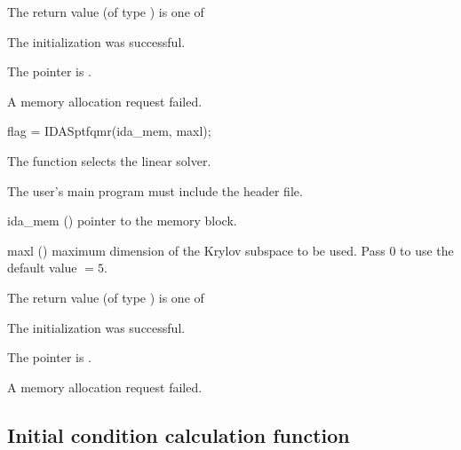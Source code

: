 {
  The return value  (of type ) is one of
  \begin{args}
  \item[\Id{IDASPILS\_SUCCESS}] 
    The {\idaspbcg} initialization was successful.
  \item[\Id{IDASPILS\_MEM\_NULL}]
    The  pointer is .
  \item[\Id{IDASPILS\_MEM\_FAIL}]
    A memory allocation request failed.
  \end{args}
}
{}
{
  flag = IDASptfqmr(ida\_mem, maxl);
}
{
  The function  selects the {\idasptfqmr} linear solver. 

  The user's main program must include the  header file.
}
{
  \begin{args}
  \item[ida\_mem] ()
    pointer to the {\ida} memory block.
  \item[maxl] ()
    maximum dimension of the Krylov subspace to be used. Pass $0$ to use the 
    default value $=5$.
  \end{args}
}
{
  The return value  (of type ) is one of
  \begin{args}
  \item[\Id{IDASPILS\_SUCCESS}] 
    The {\idasptfqmr} initialization was successful.
  \item[\Id{IDASPILS\_MEM\_NULL}]
    The  pointer is .
  \item[\Id{IDASPILS\_MEM\_FAIL}]
    A memory allocation request failed.
  \end{args}
}
{}


\subsection{Initial condition calculation function}\label{ss:idacalcic}


